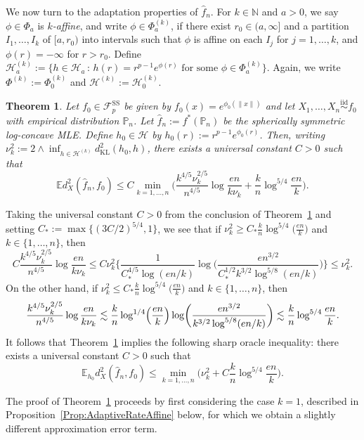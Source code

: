 \documentclass[a4paper,12pt]{article}
\newtheorem{theorem}{Theorem}
\newenvironment{remark}[1][Remark:]{\begin{trivlist}
\item[\hskip \labelsep {\bfseries #1}]}{\end{trivlist}}
\begin{document}
We now turn to the adaptation properties of $\hat{f}_n$.  For $k \in \mathbb{N}$ and $a > 0$, we say $\phi \in \Phi_a$ is \emph{$k$-affine}, and write $\phi \in \Phi_a^{(k)}$, if there exist $r_0 \in (a,\infty]$ and a partition $I_1,\ldots,I_{k}$ of $[a,r_0)$ into intervals such that $\phi$ is affine on each $I_j$ for $j=1,\ldots,k$, and $\phi(r) = -\infty$ for $r > r_0$.  Define $\mathcal{H}_a^{(k)} := \bigl\{ h \in \mathcal{H}_a\,:\, h(r) = r^{p-1}e^{\phi(r)} \textrm{ for some } \phi \in \Phi_a^{(k)}\bigr\}$.  Again, we write $\Phi^{(k)} := \Phi_0^{(k)}$ and $\mathcal{H}^{(k)} := \mathcal{H}_0^{(k)}$.
\begin{theorem}
\label{Thm:Adaptation}
Let $f_0 \in \mathcal{F}_p^{\mathrm{SS}}$ be given by $f_0(x) = e^{\phi_0(\|x\|)}$ and let $X_1,\ldots, X_n \stackrel{\mathrm{iid}}{\sim} f_0$ with empirical distribution $\mathbb{P}_n$. Let $\hat{f}_n := f^*(\mathbb{P}_n)$ be the spherically symmetric log-concave MLE.  Define $h_0 \in \mathcal{H}$ by $h_0(r) := r^{p-1}e^{\phi_0(r)}$.  Then, writing $\nu_k^2 := 2 \wedge \inf_{h \in \mathcal{H}^{(k)}} d_{\mathrm{KL}}^2(h_0,h)$, there exists a universal constant $C > 0$ such that
  \[
    \mathbb{E}d_X^2(\hat{f}_n,f_0) \leq C \min_{k =1,\ldots,n} \biggl(\frac{k^{4/5}\nu_k^{2/5}}{n^{4/5}} \log \frac{en}{k\nu_k} + \frac{k}{n}\log^{5/4}\frac{en}{k}\biggr).
  \]
\end{theorem}
\begin{remark}
Taking the universal constant $C > 0$ from the conclusion of Theorem~\ref{Thm:Adaptation} and setting $C_* := \max\{(3C/2)^{5/4},1\}$, we see that if $\nu_k^2 \geq C_* \frac{k}{n} \log^{5/4} \bigl(\frac{en}{k}\bigr)$ and $k \in \{1,\ldots,n\}$, then
\[
C\frac{k^{4/5}\nu_k^{2/5}}{n^{4/5}}\log\frac{en}{k\nu_k} \leq C\nu_k^2\biggl\{\frac{1}{C_*^{4/5}\log(en/k)}\log\biggl(\frac{en^{3/2}}{C_*^{1/2}k^{3/2} \log^{5/8}(en/k)}\biggr)\biggr\} \leq \nu_k^2.
\]
On the other hand, if $\nu_k^2 \leq C_* \frac{k}{n} \log^{5/4} \bigl(\frac{en}{k}\bigr)$ and $k \in \{1,\ldots,n\}$, then
\[
\frac{k^{4/5}\nu_k^{2/5}}{n^{4/5}}\log\frac{en}{k\nu_k} \lesssim \frac{k}{n}\log^{1/4}\Bigl(\frac{en}{k}\Bigr)\log\biggl(\frac{en^{3/2}}{k^{3/2}\log^{5/8}(en/k)}\biggr) \lesssim \frac{k}{n}\log^{5/4} \frac{en}{k}.
\]
It follows that Theorem~\ref{Thm:Adaptation} implies the following sharp oracle inequality: there exists a universal constant $C > 0$ such that  
\[
 \mathbb{E}_{h_0} d^2_X(\hat{f}_n,f_0) \leq \min_{k = 1,\ldots,n}\biggl(\nu_k^2 + C\frac{k}{n}\log^{5/4} \frac{en}{k}\biggr).
\]
\end{remark}
The proof of Theorem~\ref{Thm:Adaptation} proceeds by first considering the case $k=1$, described in Proposition~\ref{Prop:AdaptiveRateAffine} below, for which we obtain a slightly different approximation error term. 
\end{document}
